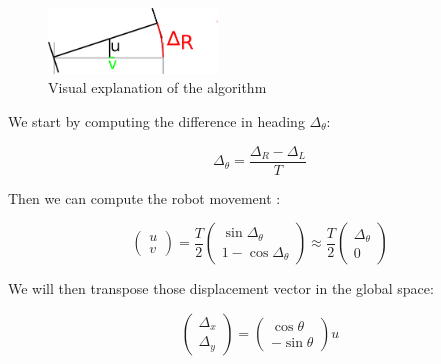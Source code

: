 \documentclass[a4paper]{paper}
\begin{document}
\begin{figure}[h]
    \begin{center}
        \includegraphics[width=0.4\textwidth]{algorithm.png}
        \caption{Visual explanation of the algorithm}
    \end{center}
\end{figure}

We start by computing the difference in heading $\Delta_\theta$:

\begin{equation}
    \Delta_\theta = \frac{\Delta_R - \Delta_L}{T}
\end{equation}

Then we can compute the robot movement :

\begin{equation}
    \begin{pmatrix}
        u\\v
    \end{pmatrix}  
    =
    \frac{T}{2}
    \begin{pmatrix}
        \sin \Delta_\theta\\1 - \cos \Delta_\theta
    \end{pmatrix}
    \approx
    \frac{T}{2}
    \begin{pmatrix}
        \Delta_\theta\\ 0
    \end{pmatrix}
\end{equation}

We will then transpose those displacement vector in the global space:

\begin{equation}
    \begin{pmatrix}
        \Delta_x\\\Delta_y
    \end{pmatrix}
    =
    \begin{pmatrix}
        \cos\theta \\-\sin\theta
    \end{pmatrix}
    u 
\end{equation}
\end{document}
